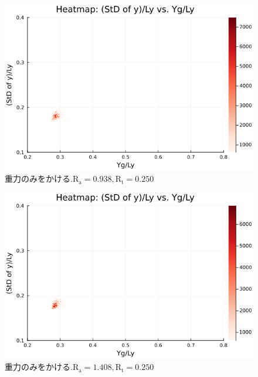 \begin{figure}[H]
  \centering
  \includegraphics[scale=0.6]{image/dT0_heat/2024-01-15T14:30:47.659_mapg0_chi0_Ay50_rho0.4_T0.43_dT0.0_Rd0.0_Rt0.25_Ra0.938769_g0.0003999718779659611_run4.0e7.png}
  \caption{$重力のみをかける. \text{R}_\text{a}=0.938,\text{R}_\text{t}=0.250$}
  \label{}
\end{figure}

\begin{figure}[H]
  \centering
  \includegraphics[scale=0.6]{image/dT0_heat/2024-01-15T14:30:47.726_mapg0_chi0_Ay50_rho0.4_T0.43_dT0.0_Rd0.0_Rt0.25_Ra1.4081535_g0.0003999718779659611_run4.0e7.png}
  \caption{$重力のみをかける. \text{R}_\text{a}=1.408,\text{R}_\text{t}=0.250$}
  \label{}
\end{figure}

